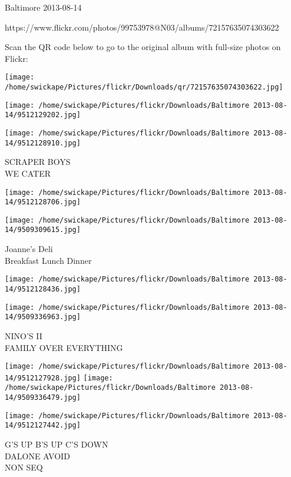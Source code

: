 \documentclass[10pt,letterpaper]{article}
\begin{document}
Baltimore 2013-08-14

https://www.flickr.com/photos/99753978@N03/albums/72157635074303622

Scan the QR code below to go to the original album with full-size photos on Flickr:

\texttt{[image: /home/swickape/Pictures/flickr/Downloads/qr/72157635074303622.jpg]}
\pagebreak

\texttt{[image: /home/swickape/Pictures/flickr/Downloads/Baltimore 2013-08-14/9512129202.jpg]}

\vspace{0.25in}
\texttt{[image: /home/swickape/Pictures/flickr/Downloads/Baltimore 2013-08-14/9512128910.jpg]}

SCRAPER BOYS\\
WE CATER\\
\pagebreak

\texttt{[image: /home/swickape/Pictures/flickr/Downloads/Baltimore 2013-08-14/9512128706.jpg]}

\vspace{0.25in}
\texttt{[image: /home/swickape/Pictures/flickr/Downloads/Baltimore 2013-08-14/9509309615.jpg]}

Joanne's Deli\\
Breakfast Lunch Dinner\\
\pagebreak

\texttt{[image: /home/swickape/Pictures/flickr/Downloads/Baltimore 2013-08-14/9512128436.jpg]}

\vspace{0.25in}
\texttt{[image: /home/swickape/Pictures/flickr/Downloads/Baltimore 2013-08-14/9509336963.jpg]}

NINO'S II\\
FAMILY OVER EVERYTHING\\
\pagebreak

\texttt{[image: /home/swickape/Pictures/flickr/Downloads/Baltimore 2013-08-14/9512127928.jpg]}
\texttt{[image: /home/swickape/Pictures/flickr/Downloads/Baltimore 2013-08-14/9509336479.jpg]}

\vspace{0.25in}
\texttt{[image: /home/swickape/Pictures/flickr/Downloads/Baltimore 2013-08-14/9512127442.jpg]}

G'S UP B'S UP C'S DOWN\\
DALONE AVOID\\
NON SEQ\\
\pagebreak
\end{document}
